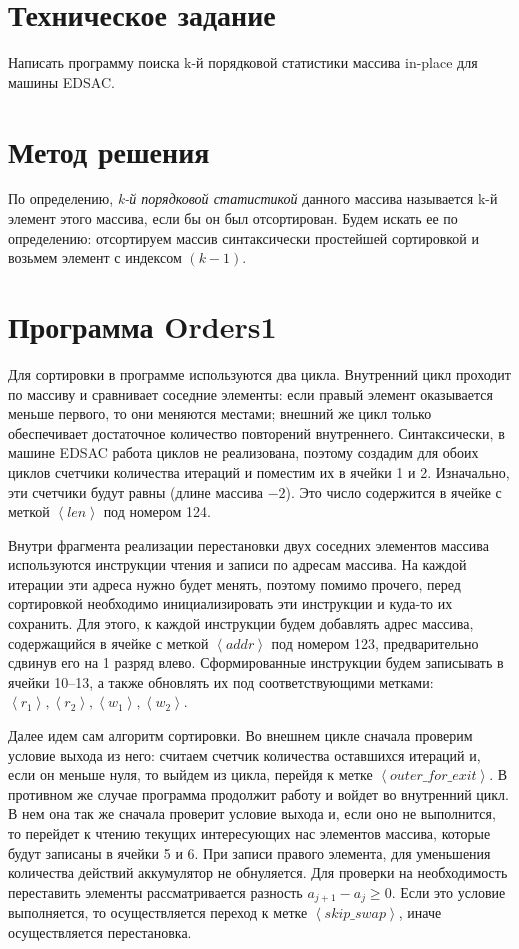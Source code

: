     \section{Техническое задание}

    Написать программу поиска k-й порядковой статистики массива in-place для машины EDSAC.

    \section{Метод решения}

    По определению, \textit{k-й порядковой статистикой} данного массива называется k-й элемент этого массива, если бы
    он был отсортирован.
    Будем искать ее по определению: отсортируем массив синтаксически простейшей сортировкой и возьмем элемент с индексом $(k - 1)$.

    \section{Программа Orders1}

    Для сортировки в программе используются два цикла.
    Внутренний цикл проходит по массиву и сравнивает соседние элементы: если правый элемент оказывается меньше первого, то они меняются местами;
    внешний же цикл только обеспечивает достаточное количество повторений внутреннего.
    Синтаксически, в машине EDSAC работа циклов не реализована, поэтому создадим для обоих циклов счетчики количества итераций и поместим их в ячейки 1 и 2.
    Изначально, эти счетчики будут равны (длине массива $ - 2$).
    Это число содержится в ячейке с меткой $\left<len\right>$ под номером 124.

    Внутри фрагмента реализации перестановки двух соседних элементов массива используются инструкции чтения и записи по адресам массива.
    На каждой итерации эти адреса нужно будет менять, поэтому помимо прочего, перед сортировкой необходимо инициализировать эти инструкции и куда-то их сохранить.
    Для этого, к каждой инструкции будем добавлять адрес массива, содержащийся в ячейке с меткой $\left<addr\right>$ под номером 123, предварительно сдвинув его на 1 разряд влево.
    Сформированные инструкции будем записывать в ячейки 10--13, а также обновлять их под соответствующими метками: $\left<r_1\right>, \left<r_2\right>, \left<w_1\right>, \left<w_2\right>$.

    Далее идем сам алгоритм сортировки.
    Во внешнем цикле сначала проверим условие выхода из него: считаем счетчик количества оставшихся итераций и, если он меньше нуля, то выйдем из цикла, перейдя к метке $\left<outer\_for\_exit\right>$.
    В противном же случае программа продолжит работу и войдет во внутренний цикл.
    В нем она так же сначала проверит условие выхода и, если оно не выполнится, то перейдет к чтению текущих интересующих нас элементов массива, которые будут записаны в ячейки 5 и 6.
    При записи правого элемента, для уменьшения количества действий аккумулятор не обнуляется.
    Для проверки на необходимость переставить элементы рассматривается разность $a_{j+1} - a_j \geq 0$.
    Если это условие выполняется, то осуществляется переход к метке $\left<skip\_swap\right>$, иначе осуществляется перестановка.

